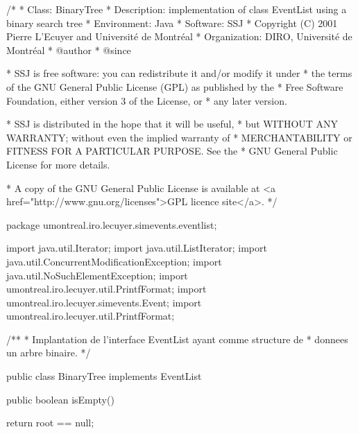 \begin{code}
\begin{hide}
/*
 * Class:        BinaryTree
 * Description:  implementation of class EventList using a binary search tree
 * Environment:  Java
 * Software:     SSJ 
 * Copyright (C) 2001  Pierre L'Ecuyer and Université de Montréal
 * Organization: DIRO, Université de Montréal
 * @author       
 * @since

 * SSJ is free software: you can redistribute it and/or modify it under
 * the terms of the GNU General Public License (GPL) as published by the
 * Free Software Foundation, either version 3 of the License, or
 * any later version.

 * SSJ is distributed in the hope that it will be useful,
 * but WITHOUT ANY WARRANTY; without even the implied warranty of
 * MERCHANTABILITY or FITNESS FOR A PARTICULAR PURPOSE.  See the
 * GNU General Public License for more details.

 * A copy of the GNU General Public License is available at
   <a href="http://www.gnu.org/licenses">GPL licence site</a>.
 */
\end{hide}
package umontreal.iro.lecuyer.simevents.eventlist;\begin{hide}

import java.util.Iterator;
import java.util.ListIterator;
import java.util.ConcurrentModificationException;
import java.util.NoSuchElementException;
import umontreal.iro.lecuyer.util.PrintfFormat;
import umontreal.iro.lecuyer.simevents.Event;
import umontreal.iro.lecuyer.util.PrintfFormat;

/**
 *  Implantation de l'interface EventList ayant comme structure de
 *  donnees un arbre binaire.
 */
\end{hide}

public class BinaryTree implements EventList\begin{hide} {
   // racine de l'arbre
   private Entry root = null;

   // liste d'objets qui peuvent etre reutilises
   private Entry freeEntries = null;

   // compteur de modifications sur l'iterateur.
   private int modCount = 0;\end{hide}
\end{code}\begin{hide}\begin{code}

   public boolean isEmpty()\begin{hide} {
      return root == null;
   }\end{hide}


\end{code}
\end{hide}
